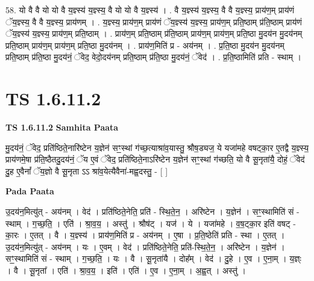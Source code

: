\documentclass[17pt]{extarticle}
\begin{document}
58. यो वै वै यो यो वै य॒ज्ञ्स्य॑ य॒ज्ञ्स्य॒ वै यो यो वै य॒ज्ञ्स्य॑ । . वै य॒ज्ञ्स्य॑ य॒ज्ञ्स्य॒ वै वै य॒ज्ञ्स्य॒ प्राय॑ण॒म् प्राय॑णं ॅय॒ज्ञ्स्य॒ वै वै य॒ज्ञ्स्य॒ प्राय॑णम् । . य॒ज्ञ्स्य॒ प्राय॑ण॒म् प्राय॑णं ॅय॒ज्ञ्स्य॑ य॒ज्ञ्स्य॒ प्राय॑ण॒म् प्रति॒ष्ठाम् प्र॑ति॒ष्ठाम् 
प्राय॑णं ॅय॒ज्ञ्स्य॑ य॒ज्ञ्स्य॒ प्राय॑ण॒म् प्रति॒ष्ठाम् । . प्राय॑ण॒म् प्रति॒ष्ठाम् प्र॑ति॒ष्ठाम् प्राय॑ण॒म् प्राय॑ण॒म् प्रति॒ष्ठा मु॒दय॑न मु॒दय॑नम् प्रति॒ष्ठाम् प्राय॑ण॒म् प्राय॑ण॒म् प्रति॒ष्ठा मु॒दय॑नम् । . प्राय॑ण॒मिति॑ प्र - अय॑नम् । . प्र॒ति॒ष्ठा मु॒दय॑न मु॒दय॑नम् प्रति॒ष्ठाम् प्र॑ति॒ष्ठा मु॒दय॑नं॒ ॅवेद॒ वेदो॒दय॑नम् प्रति॒ष्ठाम् प्र॑ति॒ष्ठा मु॒दय॑नं॒ ॅवेद॑ । . प्र॒ति॒ष्ठामिति॑ प्रति - स्थाम् । \newline
\pagebreak
{}

\section{ TS 1.6.11.2 }

\textbf{TS 1.6.11.2 } \newline
\textbf{Samhita Paata} \newline

मु॒दय॑नं॒ ॅवेद॒ प्रति॑ष्ठिते॒नारि॑ष्टेन य॒ज्ञेन॑ सꣳ॒॒स्थां ग॑च्छ॒त्याश्रा॑व॒यास्तु॒ श्रौष॒ड्यज॒ ये यजा॑महे वषट्का॒र ए॒तद्वै य॒ज्ञ्स्य॒ प्राय॑णमे॒षा प्र॑ति॒ष्ठैतदु॒दय॑नं॒ ॅय ए॒वं ॅवेद॒ प्रति॑ष्ठिते॒नाऽरि॑ष्टेन य॒ज्ञेन॑ सꣳ॒॒स्थां ग॑च्छति॒ यो वै सू॒नृता॑यै॒ दोहं॒ ॅवेद॑ दु॒ह ए॒वैनां᳚ ॅय॒ज्ञो वै सू॒नृता ऽऽ श्रा॑व॒येत्यैवैना॑-मह्व॒दस्तु॒ - [ ] \newline

\textbf{Pada Paata} \newline

उ॒दय॑न॒मित्यु॑त् - अय॑नम् । वेद॑ । प्रति॑ष्ठिते॒नेति॒ प्रति॑ - स्थि॒ते॒न॒ । अरि॑ष्टेन । य॒ज्ञेन॑ । सꣳ॒॒स्थामिति॑ सं - स्थाम् । ग॒च्छ॒ति॒ । एति॑ । श्रा॒व॒य॒ । अस्तु॑ । श्रौष॑ट् । यज॑ । ये । यजा॑महे । व॒ष॒ट्का॒र इति॑ वषट् - का॒रः । ए॒तत् । वै । य॒ज्ञ्स्य॑ । प्राय॑ण॒मिति॑ प्र - अय॑नम् । ए॒षा । प्र॒ति॒ष्ठेति॑ प्रति - स्था । ए॒तत् । उ॒दय॑न॒मित्यु॑त् - अय॑नम् । यः । ए॒वम् । वेद॑ । प्रति॑ष्ठिते॒नेति॒ प्रति॑-स्थि॒ते॒न॒ । अरि॑ष्टेन । य॒ज्ञेन॑ । सꣳ॒॒स्थामिति॑ सं - स्थाम् । ग॒च्छ॒ति॒ । यः । वै । सू॒नृता॑यै । दोह᳚म् । वेद॑ । दु॒हे । ए॒व । ए॒ना॒म् । य॒ज्ञ्ः । वै । सू॒नृता᳚ । एति॑ । श्रा॒व॒य॒ । इति॑ । एति॑ । ए॒व । ए॒ना॒म् । अ॒ह्व॒त् । अस्तु॑ ।  \newline
\end{document}
